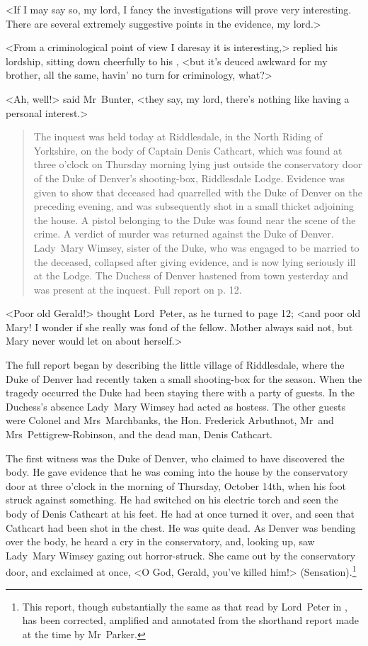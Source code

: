 <If I may say so, my lord, I fancy the investigations will prove very interesting. There are several extremely suggestive points in the evidence, my lord.>

<From a criminological point of view I daresay it is interesting,> replied his lordship, sitting down cheerfully to his , <but it's deuced awkward for my brother, all the same, havin' no turn for criminology, what?>

<Ah, well!> said Mr~Bunter, <they say, my lord, there's nothing like having a personal interest.>

\begin{quote}
\indent The inquest was held today at Riddlesdale, in the North Riding of Yorkshire, on the body of Captain Denis Cathcart, which was found at three o'clock on Thursday morning lying just outside the conservatory door of the Duke of Denver's shooting-box, Riddlesdale Lodge. Evidence was given to show that deceased had quarrelled with the Duke of Denver on the preceding evening, and was subsequently shot in a small thicket adjoining the house. A pistol belonging to the Duke was found near the scene of the crime. A verdict of murder was returned against the Duke of Denver. Lady~Mary Wimsey, sister of the Duke, who was engaged to be married to the deceased, collapsed after giving evidence, and is now lying seriously ill at the Lodge. The Duchess of Denver hastened from town yesterday and was present at the inquest. Full report on p. 12.  
\end{quote}

<Poor old Gerald!> thought Lord~Peter, as he turned to page 12; <and poor old Mary! I wonder if she really was fond of the fellow. Mother always said not, but Mary never would let on about herself.>

The full report began by describing the little village of Riddlesdale, where the Duke of Denver had recently taken a small shooting-box for the season. When the tragedy occurred the Duke had been staying there with a party of guests. In the Duchess's absence Lady~Mary Wimsey had acted as hostess. The other guests were Colonel and Mrs~Marchbanks, the Hon. Frederick Arbuthnot, Mr~and Mrs~Pettigrew-Robinson, and the dead man, Denis Cathcart.

The first witness was the Duke of Denver, who claimed to have discovered the body. He gave evidence that he was coming into the house by the conservatory door at three o'clock in the morning of Thursday, October 14th, when his foot struck against something. He had switched on his electric torch and seen the body of Denis Cathcart at his feet.  He had at once turned it over, and seen that Cathcart had been shot in the chest. He was quite dead. As Denver was bending over the body, he heard a cry in the conservatory, and, looking up, saw Lady~Mary Wimsey gazing out horror-struck. She came out by the conservatory door, and exclaimed at once, <O God, Gerald, you've killed him!> (Sensation).\footnote{This report, though substantially the same as that read by Lord~Peter in , has been corrected, amplified and annotated from the shorthand report made at the time by Mr~Parker.}

